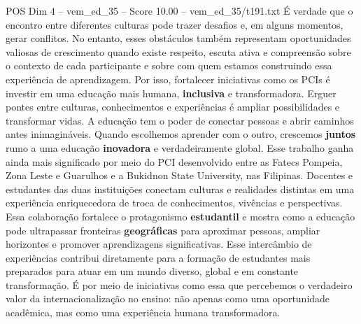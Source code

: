 \begin{textsample}{POS Dim 4 – vem\_ed\_35 – Score 10.00 – vem\_ed\_35/t191.txt}
É verdade que o encontro entre diferentes culturas pode trazer desafios e, em alguns momentos, gerar conflitos.
No entanto, esses obstáculos também representam oportunidades valiosas de crescimento quando existe respeito, escuta ativa e compreensão sobre o contexto de cada participante e sobre com quem estamos construindo essa experiência de aprendizagem.
Por isso, fortalecer iniciativas como os PCIs é investir em uma educação mais humana, \textbf{inclusiva} e transformadora.
Erguer pontes entre culturas, conhecimentos e experiências é ampliar possibilidades e transformar vidas.
A educação tem o poder de conectar pessoas e abrir caminhos antes inimagináveis.
Quando escolhemos aprender com o outro, crescemos \textbf{juntos} rumo a uma educação \textbf{inovadora} e verdadeiramente global.
Esse trabalho ganha ainda mais significado por meio do PCI desenvolvido entre as Fatecs Pompeia, Zona Leste e Guarulhos e a Bukidnon State University, nas Filipinas.
Docentes e estudantes das duas instituições conectam culturas e realidades distintas em uma experiência enriquecedora de troca de conhecimentos, vivências e perspectivas.
Essa colaboração fortalece o protagonismo \textbf{estudantil} e mostra como a educação pode ultrapassar fronteiras \textbf{geográficas} para aproximar pessoas, ampliar horizontes e promover aprendizagens significativas.
Esse intercâmbio de experiências contribui diretamente para a formação de estudantes mais preparados para atuar em um mundo diverso, global e em constante transformação.
É por meio de iniciativas como essa que percebemos o verdadeiro valor da internacionalização no ensino: não apenas como uma oportunidade acadêmica, mas como uma experiência humana transformadora.

\end{textsample}
